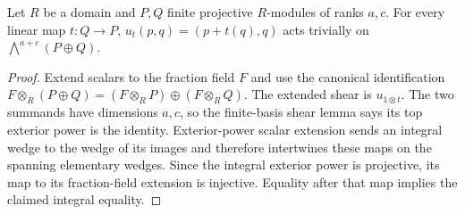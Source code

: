 \begin{lemma}
\label{lem:projective-determinant-shear}
\leanok
Let $R$ be a domain and $P,Q$ finite projective $R$-modules of ranks
$a,c$. For every linear map $t:Q\to P$, $u_t(p,q)=(p+t(q),q)$ acts
trivially on $\bigwedge^{a+c}(P\oplus Q)$.
\end{lemma}
\begin{proof}
Extend scalars to the fraction field $F$ and use the canonical identification
$F\otimes_R(P\oplus Q)=(F\otimes_R P)\oplus(F\otimes_R Q)$.
The extended shear is $u_{1\otimes t}$. The two summands have dimensions
$a,c$, so the finite-basis shear lemma says its top exterior power is the
identity. Exterior-power scalar extension sends an integral wedge to the
wedge of its images and therefore intertwines these maps on the spanning
elementary wedges. Since the integral exterior power is projective, its map
to its fraction-field extension is injective. Equality after that map
implies the claimed integral equality.
\end{proof}

